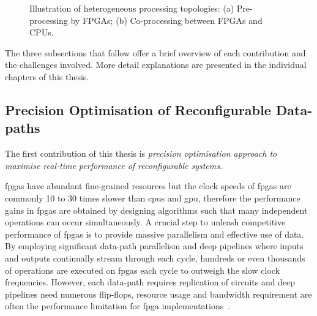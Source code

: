 \setcounter{subfigure}{0}
\begin{figure}[t!]
\centering
{}
\caption{Illustration of heterogeneous processing topologies: (a) Pre-processing by FPGAs; (b) Co-processing between FPGAs and CPUs.}
\label{fig:het_arch}
\end{figure}

The three subsections that follow offer a brief overview of each contribution and the challenges involved.
More detail explanations are presented in the individual chapters of this thesis.

\subsection{Precision Optimisation of Reconfigurable Data-paths}

The first contribution of this thesis is \textit{precision optimisation approach to maximise real-time performance of reconfigurable systems}.

\glspl{fpga} have abundant fine-grained resources but the clock speeds of \glspl{fpga} are commonly 10 to 30 times slower than \glspl{cpu} and \gls{gpu},
therefore the performance gains in \glspl{fpga} are obtained by designing algorithms such that many independent operations can occur simultaneously.
A crucial step to unleash competitive performance of \glspl{fpga} is to provide massive parallelism and effective use of data.
By employing significant data-path parallelism and deep pipelines where inputs and outputs continually stream through each cycle, hundreds or even thousands of operations are executed on \glspl{fpga} each cycle to outweigh the slow clock frequencies.
However, each data-path requires replication of circuits and deep pipelines need numerous flip-flops, resource usage and bandwidth requirement are often the performance limitation for \gls{fpga} implementations~\cite{stitt11}.


